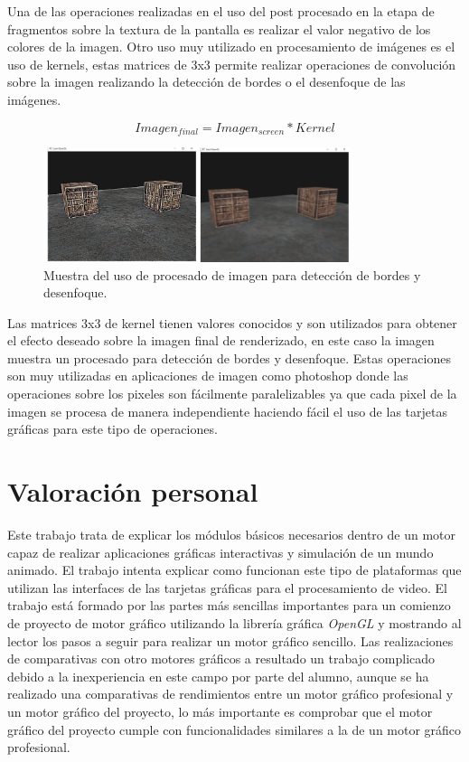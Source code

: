 \documentclass[a4paper]{book}
\begin{document}
Una de las operaciones realizadas en el uso del post procesado en la etapa de fragmentos sobre la textura de la pantalla
es realizar el valor negativo de los colores de la imagen. Otro uso muy utilizado en procesamiento de imágenes es el uso
de kernels, estas matrices de 3x3 permite realizar operaciones de convolución sobre la imagen realizando la detección de
bordes o el desenfoque de las imágenes.

\begin{equation} \label{distance}
    Imagen_{final} = Imagen_{screen} * Kernel
\end{equation}

\begin{figure}[H]
    \centering
    \includegraphics[width=9cm, keepaspectratio]{img/PostProcessing.png}
    \caption{Muestra del uso de procesado de imagen para detección de bordes y desenfoque.}
    \label{PostProcessing}
\end{figure}

Las matrices 3x3 de kernel tienen valores conocidos y son utilizados para obtener el efecto deseado sobre la imagen final
de renderizado, en este caso la imagen muestra un procesado para detección de bordes y desenfoque. Estas operaciones son
muy utilizadas en aplicaciones de imagen como photoshop donde las operaciones sobre los pixeles son fácilmente paralelizables
ya que cada pixel de la imagen se procesa de manera independiente haciendo fácil el uso de las tarjetas gráficas para este
tipo de operaciones.


\section{Valoración personal}
\label{sec:valoracion}

Este trabajo trata de explicar los módulos básicos necesarios dentro de un motor capaz de realizar aplicaciones gráficas
interactivas y simulación de un mundo animado. El trabajo intenta explicar como funcionan este tipo de plataformas que utilizan
las interfaces de las tarjetas gráficas para el procesamiento de video. El trabajo está formado por las partes más sencillas
importantes para un comienzo de proyecto de motor gráfico utilizando la librería gráfica \textit{OpenGL} y mostrando al lector los
pasos a seguir para realizar un motor gráfico sencillo. Las realizaciones de comparativas con otro motores gráficos a resultado un
trabajo complicado debido a la inexperiencia en este campo por parte del alumno, aunque se ha realizado una comparativas de rendimientos
entre un motor gráfico profesional y un motor gráfico del proyecto, lo más importante es comprobar que el motor gráfico del proyecto
cumple con funcionalidades similares a la de un motor gráfico profesional.
\end{document}
